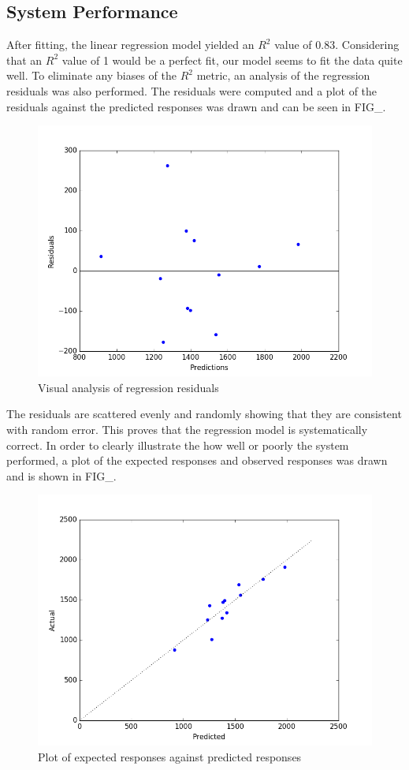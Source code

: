 \subsection{System Performance}
After fitting, the linear regression model yielded an $R^2$ value of $0.83$. Considering that an $R^2$ value of 1 would be a perfect fit, our model seems to fit the data quite well. To eliminate any biases of the $R^2$ metric, an analysis of the regression residuals was also performed. The residuals were computed and a plot of the residuals against the predicted responses was drawn and can be seen in FIG\_.
\begin{figure}[ht!]
\centering
\includegraphics[scale=0.5]{Images/residuals}
\caption{Visual analysis of regression residuals}
\label{fig1}
\end{figure}
The residuals are scattered evenly and randomly showing that they are consistent with random error. This proves that the regression model is systematically correct. In order to clearly illustrate the how well or poorly the system performed, a plot of the expected responses and observed responses was drawn and is shown in FIG\_.
\begin{figure}[ht!]
\centering
\includegraphics[scale=0.5]{Images/ac_v_pred}
\caption{Plot of expected responses against predicted responses}
\label{fig1}
\end{figure}
